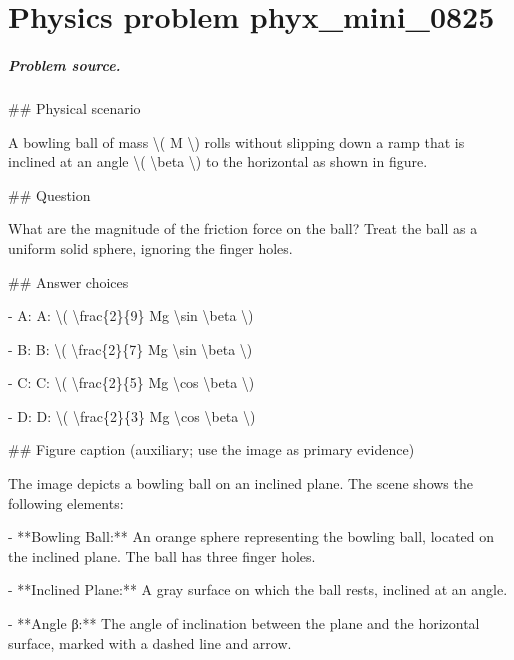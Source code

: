 
\chapter{Physics problem phyx\_mini\_0825}
\label{ch:PhyXMiniProblems_problem_phyx_mini_0825}

\paragraph{Problem source.}
\#\# Physical scenario

A bowling ball of mass \textbackslash{}( M \textbackslash{}) rolls without slipping down a ramp that is inclined at an angle \textbackslash{}( \textbackslash{}beta \textbackslash{}) to the horizontal as shown in figure.

\#\# Question

What are the magnitude of the friction force on the ball? Treat the ball as a uniform solid sphere, ignoring the finger holes.

\#\# Answer choices

- A: A: \textbackslash{}( \textbackslash{}frac\{2\}\{9\} Mg \textbackslash{}sin \textbackslash{}beta \textbackslash{})

- B: B: \textbackslash{}( \textbackslash{}frac\{2\}\{7\} Mg \textbackslash{}sin \textbackslash{}beta \textbackslash{})

- C: C: \textbackslash{}( \textbackslash{}frac\{2\}\{5\} Mg \textbackslash{}cos \textbackslash{}beta \textbackslash{})

- D: D: \textbackslash{}( \textbackslash{}frac\{2\}\{3\} Mg \textbackslash{}cos \textbackslash{}beta \textbackslash{})

\#\# Figure caption (auxiliary; use the image as primary evidence)

The image depicts a bowling ball on an inclined plane. The scene shows the following elements:

- **Bowling Ball:** An orange sphere representing the bowling ball, located on the inclined plane. The ball has three finger holes.
  
- **Inclined Plane:** A gray surface on which the ball rests, inclined at an angle.
  
- **Angle β:** The angle of inclination between the plane and the horizontal surface, marked with a dashed line and arrow.

